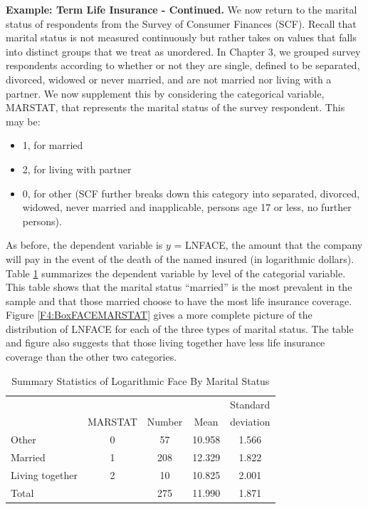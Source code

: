\textbf{Example: Term Life Insurance - Continued.} We now return to
the marital status of respondents from the Survey of Consumer
Finances (SCF). Recall that marital status is not measured
continuously but rather takes on values that falls into distinct
groups that we treat as unordered. In Chapter 3, we grouped survey
respondents according to whether or not they are single, defined to
be separated, divorced, widowed or never married, and are not
married nor living with a partner. We now supplement this by
considering the categorical variable, MARSTAT, that represents the
marital status of the survey respondent. This may be:
\bigskip
\begin{itemize}
 \item 1, for married
 \item 2, for living with partner
 \item 0, for other (SCF further breaks down this category into
 separated, divorced, widowed, never married and inapplicable,
 persons age 17 or less, no further persons).
 \end{itemize}
As before, the dependent variable is $y$ = LNFACE, the amount that
the company will pay in the event of the death of the named insured
(in logarithmic dollars). Table \ref{T4:MaritalSumStats} summarizes
the dependent variable by level of the categorial variable. This
table shows that the marital status ``married'' is the most
prevalent in the sample and that those married choose to have the
most life insurance coverage. Figure \ref{F4:BoxFACEMARSTAT} gives a
more complete picture of the distribution of LNFACE for each of the
three types of marital status. The table and figure also suggests
that those living together have less life insurance coverage than
the other two categories.


\begin{table}[h] \caption{\label{T4:MaritalSumStats} Summary
Statistics of Logarithmic Face By Marital Status}
\begin{tabular}{lcccc}
\hline
&  &  &  & Standard \\
& MARSTAT & Number & Mean & deviation\\\hline
Other           & 0 & 57 & 10.958 & 1.566 \\
Married         & 1 & 208 & 12.329 & 1.822 \\
Living together & 2 & 10 & 10.825 & 2.001 \\ \hline
Total           &   & 275 & 11.990 & 1.871 \\
 \hline
\end{tabular}
\end{table}


